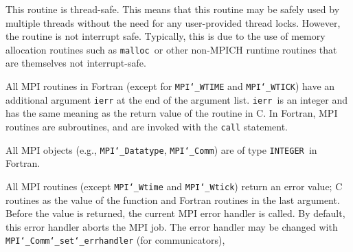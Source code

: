 \par
{}
\par
{}
\par
This routine is thread-safe.  This means that this routine may be
safely used by multiple threads without the need for any user-provided
thread locks.  However, the routine is not interrupt safe.  Typically,
this is due to the use of memory allocation routines such as {\tt malloc
}or other non-MPICH runtime routines that are themselves not interrupt-safe.
\par
{}
All MPI routines in Fortran (except for {\tt MPI{\tt \char`\_}WTIME} and {\tt MPI{\tt \char`\_}WTICK}) have
an additional argument {\tt ierr} at the end of the argument list.  {\tt ierr
}is an integer and has the same meaning as the return value of the routine
in C.  In Fortran, MPI routines are subroutines, and are invoked with the
{\tt call} statement.
\par
All MPI objects (e.g., {\tt MPI{\tt \char`\_}Datatype}, {\tt MPI{\tt \char`\_}Comm}) are of type {\tt INTEGER
}in Fortran.
\par
{}
\par
All MPI routines (except {\tt MPI{\tt \char`\_}Wtime} and {\tt MPI{\tt \char`\_}Wtick}) return an error value;
C routines as the value of the function and Fortran routines in the last
argument.  Before the value is returned, the current MPI error handler is
called.  By default, this error handler aborts the MPI job.  The error handler
may be changed with {\tt MPI{\tt \char`\_}Comm{\tt \char`\_}set{\tt \char`\_}errhandler} (for communicators),
